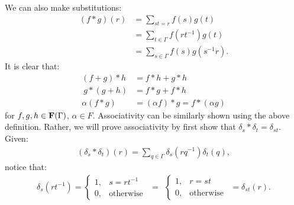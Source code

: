 \begin{example}
        We can also make substitutions:
            \begin{equation*}
            \begin{split}
                (f \ast g)(r)
                & = \sum_{st = r}f(s)g(t) \\
                & = \sum_{t \in \Gamma} f(rt^{-1})g(t) \\
                &  =\sum_{s \in \Gamma}f(s)g(s^{-1}r).
            \end{split}
            \end{equation*}
        It is clear that:
            \begin{equation*}
            \begin{split}
                (f+g)\ast h &= f \ast h + g \ast h \\\
                g \ast (g+h) &= f \ast g + f \ast h \\
                \alpha(f \ast g) &= (\alpha f)\ast g = f \ast (\alpha g)
            \end{split}
            \end{equation*}
        for $f,g,h \in \mathbf{F}(\Gamma)$, $\alpha \in F$. Associativity can be similarly shown using the above definition. Rather, we will prove associativity by first show that $\delta_s \ast \delta_t = \delta_{st}$. Given:
            \begin{equation*}
            \begin{split}
                (\delta_s \ast \delta_t)(r) = \sum_{q \in \Gamma} \delta_s(rq^{-1})\delta_t(q),
            \end{split}
            \end{equation*}
        notice that:
            \begin{equation*}
            \begin{split}
                \delta_s(rt^{-1}) = \begin{cases}
                    1, &s = rt^{-1} \\
                    0, &\text{otherwise}
                \end{cases}
                \hspace{5pt}=\hspace{5pt}
                \begin{cases}
                    1,& r = st \\
                    0 ,& \text{otherwise}
                \end{cases}
                \hspace{5pt} = \delta_{st}(r).

\end{split}
\end{equation*}
\end{example}
